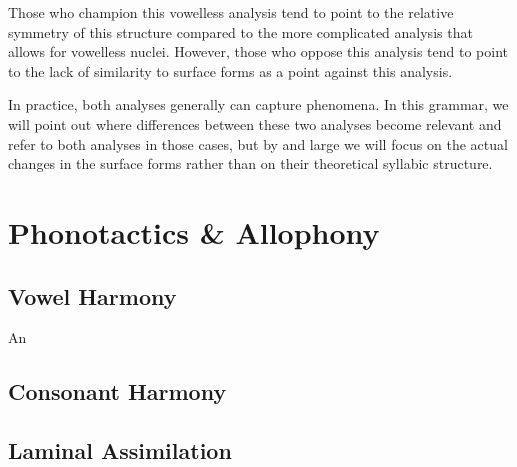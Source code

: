 \documentclass[a4paper,11pt,oneside,openany]{memoir}
\begin{document}
Those who champion this vowelless analysis tend to point to the relative symmetry of this structure compared to the more complicated analysis that allows for vowelless nuclei. However, those who oppose this analysis tend to point to the lack of similarity to surface forms as a point against this analysis. 

In practice, both analyses generally can capture \lang{} phenomena. In this grammar, we will point out where differences between these two analyses become relevant and refer to both analyses in those cases, but by and large we will focus on the actual changes in the surface forms rather than on their theoretical syllabic structure.

\section{Phonotactics \& Allophony}\label{sec:allophony}

\subsection{Vowel Harmony}\label{ssec:vowelharmony}

An 

\subsection{Consonant Harmony}\label{ssec:vowelharmony}

\subsection{Laminal Assimilation}
\end{document}
